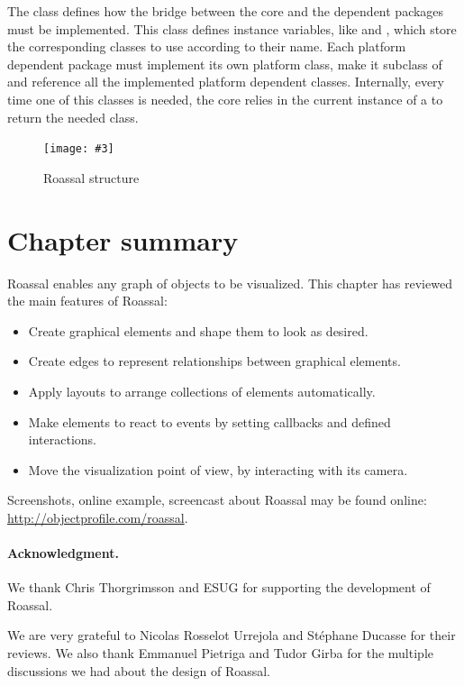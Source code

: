 \documentclass[a4paper,10pt,twoside]{book}
\newcommand{\fig}[4]{
		\begin{figure}[#1]
			\centering
			\texttt{[image: \#3]}
			\caption{\label{fig:#3}#4}
		\end{figure}}
\begin{document}
The  class defines how the bridge between the core and the dependent packages must be implemented. This class defines instance variables, like  and , which store the corresponding classes to use according to their name. Each platform dependent package must implement its own platform class, make it subclass of  and reference all the implemented platform dependent classes.
Internally, every time one of this classes is needed, the core relies in the current instance of a  to return the needed class.

\fig{H}{0.3}{structure}{Roassal structure}


\section{Chapter summary}

Roassal enables any graph of objects to be visualized. This chapter has reviewed the main features of Roassal:

\begin{itemize}
\item Create graphical elements and shape them to look as desired.
\item Create edges to represent relationships between graphical elements.
\item Apply layouts to arrange collections of elements automatically.
\item Make elements to react to events by setting callbacks and defined interactions.
\item Move the visualization point of view, by interacting with its camera.
\end{itemize}

Screenshots, online example, screencast about Roassal may be found online: \url{http://objectprofile.com/roassal}.

\paragraph{Acknowledgment.}
We thank Chris Thorgrimsson and ESUG for supporting the development of Roassal.

We are very grateful to Nicolas Rosselot Urrejola and St\'ephane Ducasse for their reviews. We also thank Emmanuel Pietriga and Tudor Girba for the multiple discussions we had about the design of Roassal. 

%
%


\ifx\wholebook\relax\else
   
   
\end{document}
